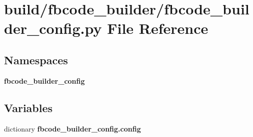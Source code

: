 \section{build/fbcode\+\_\+builder/fbcode\+\_\+builder\+\_\+config.py File Reference}
\label{fbcode__builder_2fbcode__builder__config_8py}
\subsection*{Namespaces}
\begin{DoxyCompactItemize}
\item 
 {\bf fbcode\+\_\+builder\+\_\+config}
\end{DoxyCompactItemize}
\subsection*{Variables}
\begin{DoxyCompactItemize}
\item 
dictionary {\bf fbcode\+\_\+builder\+\_\+config.\+config}
\end{DoxyCompactItemize}
